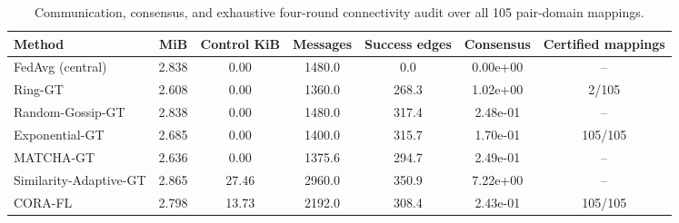 \begin{table}[t]
\centering
\caption{Communication, consensus, and exhaustive four-round connectivity audit over all 105 pair-domain mappings.}
\label{tab:confirmatory_system}
\small
\begin{tabular}{lcccccc}
\toprule
Method & MiB & Control KiB & Messages & Success edges & Consensus & Certified mappings \\
\midrule
FedAvg (central) & 2.838 & 0.00 & 1480.0 & 0.0 & 0.00e+00 & -- \\
Ring-GT & 2.608 & 0.00 & 1360.0 & 268.3 & 1.02e+00 & 2/105 \\
Random-Gossip-GT & 2.838 & 0.00 & 1480.0 & 317.4 & 2.48e-01 & -- \\
Exponential-GT & 2.685 & 0.00 & 1400.0 & 315.7 & 1.70e-01 & 105/105 \\
MATCHA-GT & 2.636 & 0.00 & 1375.6 & 294.7 & 2.49e-01 & -- \\
Similarity-Adaptive-GT & 2.865 & 27.46 & 2960.0 & 350.9 & 7.22e+00 & -- \\
CORA-FL & 2.798 & 13.73 & 2192.0 & 308.4 & 2.43e-01 & 105/105 \\
\bottomrule
\end{tabular}
\end{table}

